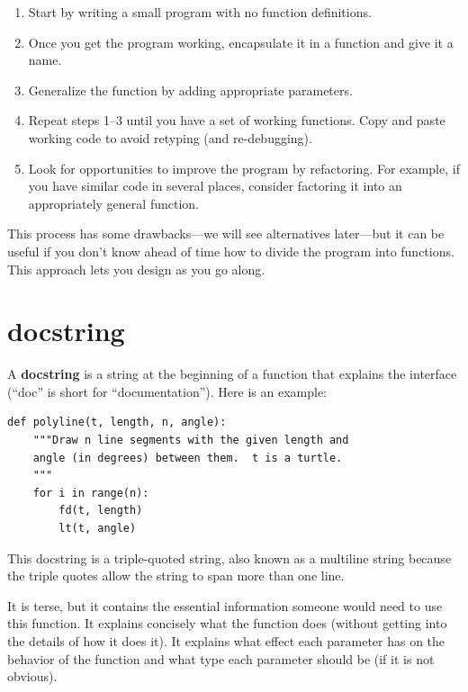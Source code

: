 \documentclass[10pt]{book}
\begin{document}
\begin{enumerate}

\item Start by writing a small program with no function definitions.

\item Once you get the program working, encapsulate it in a function
and give it a name.

\item Generalize the function by adding appropriate parameters.

\item Repeat steps 1--3 until you have a set of working functions.
Copy and paste working code to avoid retyping (and re-debugging).

\item Look for opportunities to improve the program by refactoring.
For example, if you have similar code in several places, consider
factoring it into an appropriately general function.

\end{enumerate}

This process has some drawbacks---we will see alternatives later---but
it can be useful if you don't know ahead of time how to divide the
program into functions.  This approach lets you design as you go
along.


\section{docstring}
\label{docstring}

A {\bf docstring} is a string at the beginning of a function that
explains the interface (``doc'' is short for ``documentation'').  Here
is an example:

\beforeverb
\begin{verbatim}
def polyline(t, length, n, angle):
    """Draw n line segments with the given length and
    angle (in degrees) between them.  t is a turtle.
    """    
    for i in range(n):
        fd(t, length)
        lt(t, angle)
\end{verbatim}
\afterverb
%
This docstring is a triple-quoted string, also known
as a multiline string because the triple quotes allow the string
to span more than one line.


It is terse, but it contains the essential information
someone would need to use this function.  It explains concisely what
the function does (without getting into the details of how it does
it).  It explains what effect each parameter has on the behavior of
the function and what type each parameter should be (if it is not
obvious).
\end{document}
